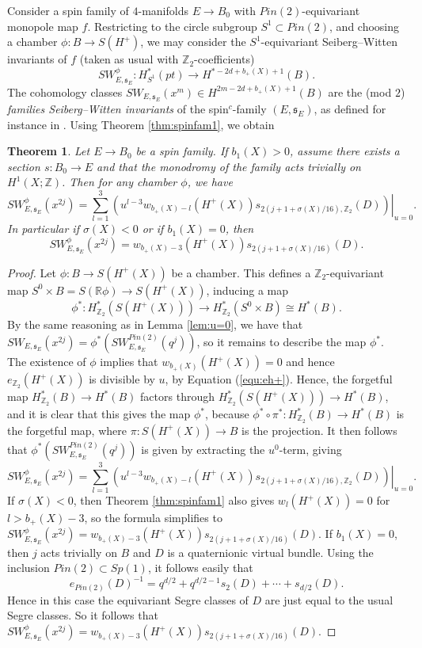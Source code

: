 \documentclass{amsart}
\newtheorem{theorem}{Theorem}[section]
\theoremstyle{definition}
\theoremstyle{remark}
\numberwithin{equation}{section}
\begin{document}
Consider a spin family of $4$-manifolds $E \to B_0$ with $Pin(2)$-equivariant monopole map $f$. Restricting to the circle subgroup $S^1 \subset Pin(2)$, and choosing a chamber $\phi : B \to S(H^+)$, we may consider the $S^1$-equivariant Seiberg--Witten invariants of $f$ (taken as usual with $\mathbb{Z}_2$-coefficients)
\[
SW^\phi_{E , \mathfrak{s}_E} : H^*_{S^1}(pt) \to H^{*-2d+b_+(X)+1}(B).
\]
The cohomology classes $SW_{E , \mathfrak{s}_E}(x^m) \in H^{2m-2d+b_+(X)+1}(B)$ are the (mod $2$) {\em families Seiberg--Witten invariants} of the spin$^c$-family $(E , \mathfrak{s}_E)$, as defined for instance in \cite{bk}. Using Theorem \ref{thm:spinfam1}, we obtain 

\begin{theorem}\label{thm:spinfam2}
Let $E \to B_0$ be a spin family. If $b_1(X) > 0$, assume there exists a section $s : B_0 \to E$ and that the monodromy of the family acts trivially on $H^1(X ; \mathbb{Z})$. Then for any chamber $\phi$, we have
\[
SW^\phi_{E,\mathfrak{s}_E}( x^{2j} ) = \sum_{l=1}^{3} \left. \left( u^{l-3} w_{b_+(X)-l}(H^+(X)) s_{2(j+1+\sigma(X)/16),\mathbb{Z}_2}(D) \right) \right|_{u=0}.
\]
In particular if $\sigma(X) < 0$ or if $b_1(X)=0$, then 
\[
SW^\phi_{E,\mathfrak{s}_E}( x^{2j} ) = w_{b_+(X)-3}(H^+(X)) s_{2(j+1+\sigma(X)/16)}(D).
\]
\end{theorem}
\begin{proof}
Let $\phi : B \to S(H^+(X))$ be a chamber. This defines a $\mathbb{Z}_2$-equivariant map $S^0 \times B = S(\mathbb{R}\phi) \to S(H^+(X))$, inducing a map
\[
\phi^* : H^*_{\mathbb{Z}_2}( S(H^+(X)) ) \to H^*_{\mathbb{Z}_2}( S^0 \times B ) \cong H^*(B).
\]
By the same reasoning as in Lemma \ref{lem:u=0}, we have that $SW_{E,\mathfrak{s}_E}( x^{2j} ) = \phi^* (SW_{E,\mathfrak{s}_E}^{Pin(2)}(q^j))$, so it remains to describe the map $\phi^*$. The existence of $\phi$ implies that $w_{b_+(X)}( H^+(X) ) = 0$ and hence $e_{\mathbb{Z}_2}(H^+(X))$ is divisible by $u$, by Equation (\ref{equ:eh+}). Hence, the forgetful map $H^*_{\mathbb{Z}_2}(B) \to H^*(B)$ factors through $H^*_{\mathbb{Z}_2}( S(H^+(X))) \to H^*(B)$, and it is clear that this gives the map $\phi^*$, because $\phi^* \circ \pi^* : H^*_{\mathbb{Z}_2}(B) \to H^*(B)$ is the forgetful map, where $\pi : S(H^+(X)) \to B$ is the projection. It then follows that $\phi^* (SW_{E,\mathfrak{s}_E}^{Pin(2)}(q^j))$ is given by extracting the $u^0$-term, giving
\[
SW^\phi_{E,\mathfrak{s}_E}( x^{2j} ) = \sum_{l=1}^{3} \left. \left( u^{l-3} w_{b_+(X)-l}(H^+(X)) s_{2(j+1+\sigma(X)/16),\mathbb{Z}_2}(D) \right) \right|_{u=0}.
\]
If $\sigma(X) < 0$, then Theorem \ref{thm:spinfam1} also gives $w_l(H^+(X)) = 0$ for $l > b_+(X)-3$, so the formula simplifies to $SW^\phi_{E,\mathfrak{s}_E}( x^{2j} ) = w_{b_+(X)-3}(H^+(X)) s_{2(j+1+\sigma(X)/16)}(D)$. If $b_1(X) = 0$, then $j$ acts trivially on $B$ and $D$ is a quaternionic virtual bundle. Using the inclusion $Pin(2) \subset Sp(1)$, it follows easily that
\[
e_{Pin(2)}( D )^{-1} = q^{d/2} + q^{d/2 - 1} s_2(D) + \cdots + s_{d/2}(D).
\]
Hence in this case the equivariant Segre classes of $D$ are just equal to the usual Segre classes. So it follows that  $SW^\phi_{E,\mathfrak{s}_E}( x^{2j} ) = w_{b_+(X)-3}(H^+(X)) s_{2(j+1+\sigma(X)/16)}(D)$.
\end{proof}
\end{document}
